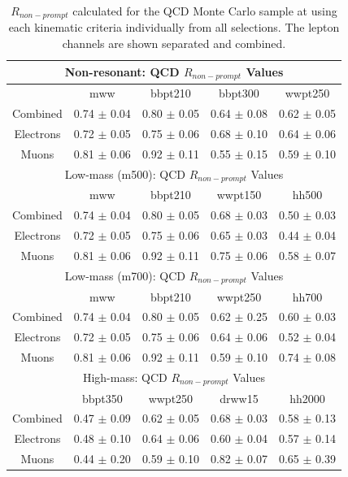 \begin{table}[h!]
\centering
\begin{tabular}{c|c|c|c|c}

\hline\hline
\multicolumn{5}{c}{Non-resonant: QCD $R_{non-prompt}$ Values}\\\hline\hline 
          & mww                 & bbpt210 	        & bbpt300 	        & wwpt250	        \\ \hline 
Combined  & 0.74 $\pm$ 0.04 	& 0.80 $\pm$ 0.05  	& 0.64 $\pm$ 0.08 	& 0.62 $\pm$ 0.05	\\\hline 
Electrons & 0.72 $\pm$ 0.05  	& 0.75 $\pm$ 0.06 	& 0.68 $\pm$ 0.10 	& 0.64 $\pm$ 0.06	\\\hline 
Muons     & 0.81 $\pm$ 0.06 	& 0.92 $\pm$ 0.11 	& 0.55 $\pm$ 0.15 	& 0.59 $\pm$ 0.10	\\\hline 
\hline\hline
\multicolumn{5}{c}{Low-mass (m500): QCD $R_{non-prompt}$ Values}\\\hline\hline 
          & mww                 & bbpt210 	        & wwpt150 	        & hh500 	        \\ \hline 
Combined  & 0.74 $\pm$ 0.04 	& 0.80 $\pm$ 0.05 	& 0.68 $\pm$ 0.03  	& 0.50 $\pm$ 0.03	\\\hline 
Electrons & 0.72 $\pm$ 0.05 	& 0.75 $\pm$ 0.06 	& 0.65 $\pm$ 0.03 	& 0.44 $\pm$ 0.04	\\\hline 
Muons     & 0.81 $\pm$ 0.06 	& 0.92 $\pm$ 0.11 	& 0.75 $\pm$ 0.06 	& 0.58 $\pm$ 0.07	\\\hline 
\hline\hline

\multicolumn{5}{c}{Low-mass (m700): QCD $R_{non-prompt}$ Values}\\\hline\hline 
          & mww                 & bbpt210 	        & wwpt250 	        & hh700 	        \\ \hline 
Combined  & 0.74 $\pm$ 0.04 	& 0.80 $\pm$ 0.05 	& 0.62 $\pm$ 0.25 	& 0.60 $\pm$ 0.03	\\\hline 
Electrons & 0.72 $\pm$ 0.05 	& 0.75 $\pm$ 0.06 	& 0.64 $\pm$ 0.06 	& 0.52 $\pm$ 0.04	\\\hline 
Muons     & 0.81 $\pm$ 0.06 	& 0.92 $\pm$ 0.11 	& 0.59 $\pm$ 0.10 	& 0.74 $\pm$ 0.08	\\\hline 
\hline\hline


\multicolumn{5}{c}{High-mass: QCD $R_{non-prompt}$ Values}\\\hline\hline 
          & bbpt350             & wwpt250 	        & drww15 	        & hh2000 	        \\ \hline 
Combined  & 0.47 $\pm$ 0.09 	& 0.62 $\pm$ 0.05 	& 0.68 $\pm$ 0.03 	& 0.58 $\pm$ 0.13	\\\hline 
Electrons & 0.48 $\pm$ 0.10 	& 0.64 $\pm$ 0.06 	& 0.60 $\pm$ 0.04 	& 0.57 $\pm$ 0.14	\\\hline 
Muons     & 0.44 $\pm$ 0.20 	& 0.59 $\pm$ 0.10 	& 0.82 $\pm$ 0.07 	& 0.65 $\pm$ 0.39	\\\hline 
\hline\hline


\end{tabular}
\caption[$R_{non-prompt}$]{$R_{non-prompt}$ calculated for the QCD Monte Carlo sample at using each kinematic criteria individually from all selections. The lepton channels are shown separated and combined.}
\label{tab:lepR}
\end{table}
